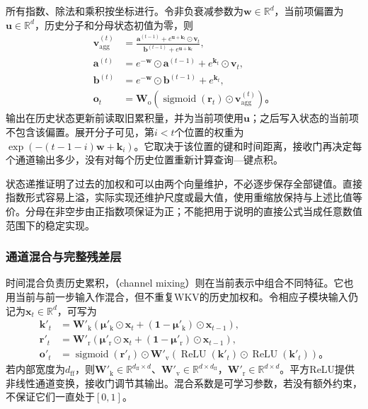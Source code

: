 所有指数、除法和乘积按坐标进行。令非负衰减参数为$\bm{w}\in\mathbb{R}^{d}$，当前项偏置为$\bm{u}\in\mathbb{R}^{d}$，历史分子和分母状态初值为零，则
\begin{equation}
  \begin{aligned}
    \bm{v}_{\mathrm{agg}}^{(t)}&=
      \frac{\bm{a}^{(t-1)}+e^{\bm{u}+\bm{k}_t}\odot\bm{v}_t}
           {\bm{b}^{(t-1)}+e^{\bm{u}+\bm{k}_t}},\\
    \bm{a}^{(t)}&=e^{-\bm{w}}\odot\bm{a}^{(t-1)}
                    +e^{\bm{k}_t}\odot\bm{v}_t,\\
    \bm{b}^{(t)}&=e^{-\bm{w}}\odot\bm{b}^{(t-1)}+e^{\bm{k}_t},\\
    \bm{o}_t&=\bm{W}_{\mathrm{o}}\!\left(
      \operatorname{sigmoid}(\bm{r}_t)\odot\bm{v}_{\mathrm{agg}}^{(t)}\right)\text{。}
  \end{aligned}
  \label{eq:rnn-rwkv-recurrence}
\end{equation}
输出在历史状态更新前读取旧累积量，并为当前项使用$\bm{u}$；之后写入状态的当前项不包含该偏置。展开分子可见，第$i<t$个位置的权重为$\exp(-(t-1-i)\bm{w}+\bm{k}_i)$。它取决于该位置的键和时间距离，接收门再决定每个通道输出多少，没有对每个历史位置重新计算查询—键点积。

状态递推证明了过去的加权和可以由两个向量维护，不必逐步保存全部键值。直接指数形式容易上溢，实际实现还维护尺度或最大值，使用重缩放保持与上述比值等价。分母在非空步由正指数项保证为正；不能把用于说明的直接公式当成任意数值范围下的稳定实现。

\subsubsection{通道混合与完整残差层}
\label{sec:rnn-rwkv-architecture}

时间混合负责历史累积，（channel mixing）则在当前表示中组合不同特征。它也用当前与前一步输入作混合，但不重复WKV的历史加权和。令相应子模块输入仍记为$\bm x_t\in\mathbb R^d$，可写为
\begin{equation}
  \begin{aligned}
    \bm k'_t&=\bm W'_{\mathrm k}\left(\bm\mu'_{\mathrm k}\odot\bm x_t
          +(\bm1-\bm\mu'_{\mathrm k})\odot\bm x_{t-1}\right),\\
    \bm r'_t&=\bm W'_{\mathrm r}\left(\bm\mu'_{\mathrm r}\odot\bm x_t
          +(\bm1-\bm\mu'_{\mathrm r})\odot\bm x_{t-1}\right),\\
    \bm o'_t&=\operatorname{sigmoid}(\bm r'_t)\odot
         \bm W'_{\mathrm v}\left(\operatorname{ReLU}(\bm k'_t)
                              \odot\operatorname{ReLU}(\bm k'_t)\right)\text{。}
  \end{aligned}
  \label{eq:rnn-rwkv-channel-mixing}
\end{equation}
若内部宽度为$d_{\mathrm{ff}}$，则$\bm W'_{\mathrm k}\in\mathbb R^{d_{\mathrm{ff}}\times d}$、$\bm W'_{\mathrm v}\in\mathbb R^{d\times d_{\mathrm{ff}}}$，$\bm W'_{\mathrm r}\in\mathbb R^{d\times d}$。平方ReLU提供非线性通道变换，接收门调节其输出。混合系数是可学习参数，若没有额外约束，不保证它们一直处于$[0,1]$。

